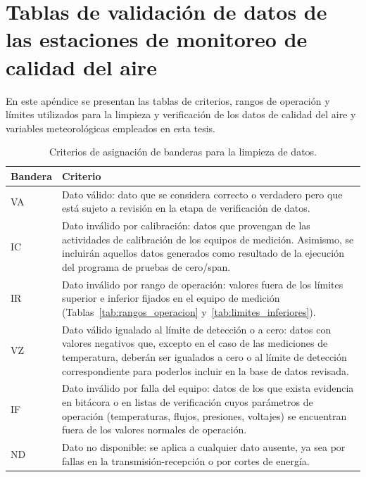 \chapter{Tablas de validación de datos 
de las estaciones de monitoreo de calidad 
del aire}
\label{anexo:tablas_validacion}

En este apéndice se presentan las tablas de criterios, rangos de operación y
límites utilizados para la limpieza y verificación de los datos de calidad
del aire y variables meteorológicas empleados en esta tesis.

\begin{table}[H]
\centering
\footnotesize
\caption{Criterios de asignación de banderas para la limpieza de datos.}
\label{tab:banderas_limpieza}
\begin{tabular}{@{}lL{.78\textwidth}@{}}
\toprule
\textbf{Bandera} & \textbf{Criterio} \\
\midrule
VA & Dato válido: dato que se considera correcto o verdadero pero que
está sujeto a revisión en la etapa de verificación de datos. \\
IC & Dato inválido por calibración: datos que provengan de las
actividades de calibración de los equipos de medición. Asimismo, se
incluirán aquellos datos generados como resultado de la ejecución del
programa de pruebas de cero/span. \\
IR & Dato inválido por rango de operación: valores fuera de los límites
superior e inferior fijados en el equipo de medición
(Tablas~\ref{tab:rangos_operacion} y~\ref{tab:limites_inferiores}). \\
VZ & Dato válido igualado al límite de detección o a cero: datos con
valores negativos que, excepto en el caso de las mediciones de
temperatura, deberán ser igualados a cero o al límite de detección
correspondiente para poderlos incluir en la base de datos revisada. \\
IF & Dato inválido por falla del equipo: datos de los que exista
evidencia en bitácora o en listas de verificación cuyos parámetros de
operación (temperaturas, flujos, presiones, voltajes) se encuentran
fuera de los valores normales de operación. \\
ND & Dato no disponible: se aplica a cualquier dato ausente, ya sea por
fallas en la transmisión-recepción o por cortes de energía. \\
\bottomrule
\end{tabular}
\end{table}

